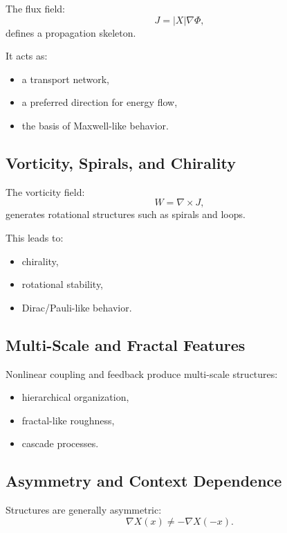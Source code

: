 \documentclass[11pt]{article}
\begin{document}
The flux field:
\begin{equation}
J = |X| \nabla \Phi,
\end{equation}
defines a propagation skeleton.

It acts as:
\begin{itemize}
\item a transport network,
\item a preferred direction for energy flow,
\item the basis of Maxwell-like behavior.
\end{itemize}

\subsection{Vorticity, Spirals, and Chirality}

The vorticity field:
\begin{equation}
W = \nabla \times J,
\end{equation}
generates rotational structures such as spirals and loops.

This leads to:
\begin{itemize}
\item chirality,
\item rotational stability,
\item Dirac/Pauli-like behavior.
\end{itemize}

\subsection{Multi-Scale and Fractal Features}

Nonlinear coupling and feedback produce multi-scale structures:
\begin{itemize}
\item hierarchical organization,
\item fractal-like roughness,
\item cascade processes.
\end{itemize}

\subsection{Asymmetry and Context Dependence}

Structures are generally asymmetric:
\begin{equation}
\nabla X(x) \neq -\nabla X(-x).
\end{equation}
\end{document}
